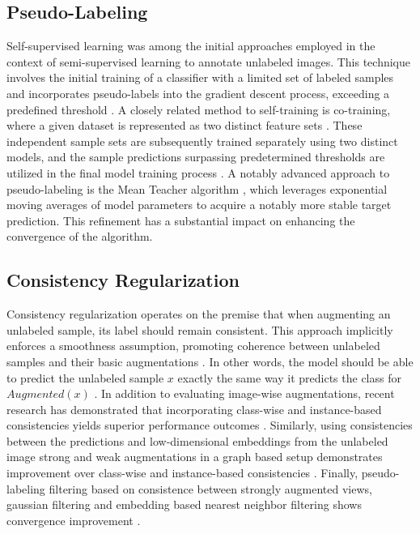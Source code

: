 \documentclass[10pt,twocolumn,letterpaper]{article}
\begin{document}
\subsection{Pseudo-Labeling}
Self-supervised learning was among the initial approaches employed in the context of semi-supervised learning to annotate unlabeled images. 
This technique involves the initial training of a classifier with a limited set of labeled samples and incorporates pseudo-labels into the gradient descent process, exceeding a predefined threshold \cite{yarowsky1995unsupervised, mcclosky2006reranking, olivier2006semi,zhai2019s4l,livieris2019predicting,rosenberg2005semi,menon2020deep}. 
A closely related method to self-training is co-training, where a given dataset is represented as two distinct feature sets \cite{blum1998combining}. 
These independent sample sets are subsequently trained separately using two distinct models, and the sample predictions surpassing predetermined thresholds are utilized in the final model training process \cite{blum1998combining,prakash2014survey}.
A notably advanced approach to pseudo-labeling is the Mean Teacher algorithm \cite{tarvainen2017mean}, which leverages exponential moving averages of model parameters to acquire a notably more stable target prediction. 
This refinement has a substantial impact on enhancing the convergence of the algorithm.


\subsection{Consistency Regularization}

Consistency regularization operates on the premise that when augmenting an unlabeled sample, its label should remain consistent. 
This approach implicitly enforces a smoothness assumption, promoting coherence between unlabeled samples and their basic augmentations \cite{xie2020unsupervised}. 
In other words, the model should be able to predict the unlabeled sample $x$ exactly the same way it predicts the class for $Augmented(x)$ \cite{berthelot2019mixmatch,sohn2020fixmatch,berthelot2019remixmatch,mustafa2020transformation}. 
In addition to evaluating image-wise augmentations, recent research has demonstrated that incorporating class-wise and instance-based consistencies yields superior performance outcomes \cite{zheng2022simmatch,li2021comatch}. 
Similarly, using consistencies between the predictions and low-dimensional embeddings from the unlabeled image strong and weak augmentations in a graph based setup demonstrates improvement over class-wise and instance-based consistencies \cite{zheng2023simmatchv2}.
Finally, pseudo-labeling filtering based on consistence between strongly augmented views, gaussian filtering and embedding based nearest neighbor filtering shows convergence improvement \cite{kim2022conmatch,menon2022semisupervised}.
\end{document}
